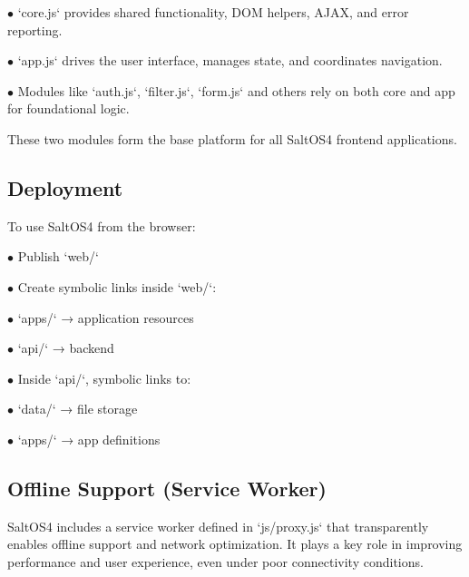 \documentclass[a4paper]{article}
\begin{document}
\begin{compactitem}
\item[\color{myblue}$\bullet$] `core.js` provides shared functionality, DOM helpers, AJAX, and error reporting.
\item[\color{myblue}$\bullet$] `app.js` drives the user interface, manages state, and coordinates navigation.
\item[\color{myblue}$\bullet$] Modules like `auth.js`, `filter.js`, `form.js` and others rely on both core and app for foundational logic.
\end{compactitem}

These two modules form the base platform for all SaltOS4 frontend applications.

\hypertarget{toc36}{}
\subsection{Deployment}

To use SaltOS4 from the browser:

\begin{compactitem}
\item[\color{myblue}$\bullet$] Publish `web/`
\item[\color{myblue}$\bullet$] Create symbolic links inside `web/`:
  \begin{compactitem}
  \item[\color{myblue}$\bullet$] `apps/` → application resources
  \item[\color{myblue}$\bullet$] `api/` → backend
  \end{compactitem}
\item[\color{myblue}$\bullet$] Inside `api/`, symbolic links to:
  \begin{compactitem}
  \item[\color{myblue}$\bullet$] `data/` → file storage
  \item[\color{myblue}$\bullet$] `apps/` → app definitions
  \end{compactitem}
\end{compactitem}

\hypertarget{toc37}{}
\subsection{Offline Support (Service Worker)}

SaltOS4 includes a service worker defined in `js/proxy.js` that transparently enables offline support and network optimization. It plays a key role in improving performance and user experience, even under poor connectivity conditions.
\end{document}
